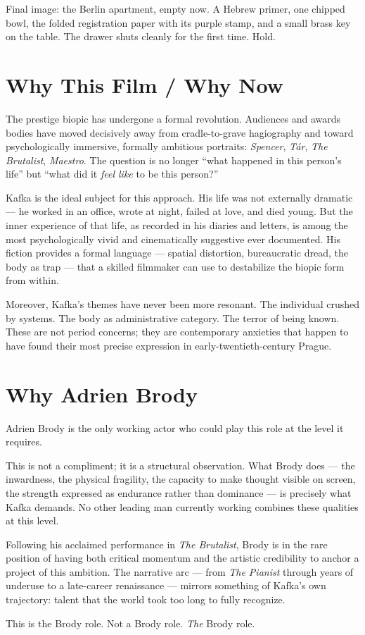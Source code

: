 Final image: the Berlin apartment, empty now. A Hebrew primer, one chipped bowl, the folded registration paper with its purple stamp, and a small brass key on the table. The drawer shuts cleanly for the first time. Hold.

\section{Why This Film / Why Now}

The prestige biopic has undergone a formal revolution. Audiences and awards bodies have moved decisively away from cradle-to-grave hagiography and toward psychologically immersive, formally ambitious portraits: \textit{Spencer}, \textit{Tár}, \textit{The Brutalist}, \textit{Maestro}. The question is no longer ``what happened in this person's life'' but ``what did it \textit{feel like} to be this person?''

Kafka is the ideal subject for this approach. His life was not externally dramatic --- he worked in an office, wrote at night, failed at love, and died young. But the inner experience of that life, as recorded in his diaries and letters, is among the most psychologically vivid and cinematically suggestive ever documented. His fiction provides a formal language --- spatial distortion, bureaucratic dread, the body as trap --- that a skilled filmmaker can use to destabilize the biopic form from within.

Moreover, Kafka's themes have never been more resonant. The individual crushed by systems. The body as administrative category. The terror of being known. These are not period concerns; they are contemporary anxieties that happen to have found their most precise expression in early-twentieth-century Prague.

\section{Why Adrien Brody}

Adrien Brody is the only working actor who could play this role at the level it requires.

This is not a compliment; it is a structural observation. What Brody does --- the inwardness, the physical fragility, the capacity to make thought visible on screen, the strength expressed as endurance rather than dominance --- is precisely what Kafka demands. No other leading man currently working combines these qualities at this level.

Following his acclaimed performance in \textit{The Brutalist}, Brody is in the rare position of having both critical momentum and the artistic credibility to anchor a project of this ambition. The narrative arc --- from \textit{The Pianist} through years of underuse to a late-career renaissance --- mirrors something of Kafka's own trajectory: talent that the world took too long to fully recognize.

This is the Brody role. Not a Brody role. \textit{The} Brody role.

